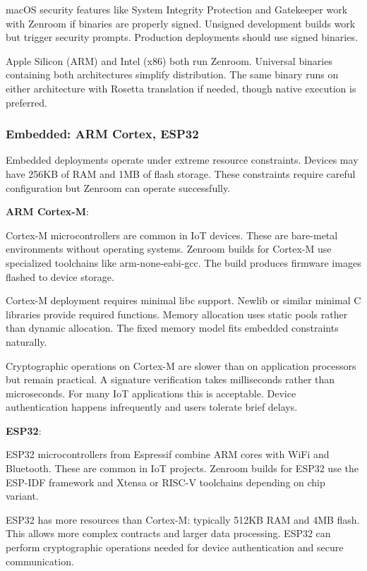macOS security features like System Integrity Protection and
Gatekeeper work with Zenroom if binaries are properly signed. Unsigned
development builds work but trigger security prompts. Production
deployments should use signed binaries.

Apple Silicon (ARM) and Intel (x86) both run Zenroom. Universal
binaries containing both architectures simplify distribution. The same
binary runs on either architecture with Rosetta translation if needed,
though native execution is preferred.

\subsubsection{Embedded: ARM Cortex, ESP32}

Embedded deployments operate under extreme resource
constraints. Devices may have 256KB of RAM and 1MB of flash
storage. These constraints require careful configuration but Zenroom
can operate successfully.

\textbf{ARM Cortex-M}:

Cortex-M microcontrollers are common in IoT devices. These are
bare-metal environments without operating systems. Zenroom builds for
Cortex-M use specialized toolchains like arm-none-eabi-gcc. The build
produces firmware images flashed to device storage.

Cortex-M deployment requires minimal libc support. Newlib or similar
minimal C libraries provide required functions. Memory allocation uses
static pools rather than dynamic allocation. The fixed memory model
fits embedded constraints naturally.

Cryptographic operations on Cortex-M are slower than on application
processors but remain practical. A signature verification takes
milliseconds rather than microseconds. For many IoT applications this
is acceptable. Device authentication happens infrequently and users
tolerate brief delays.

\textbf{ESP32}:

ESP32 microcontrollers from Espressif combine ARM cores with WiFi and
Bluetooth. These are common in IoT projects. Zenroom builds for ESP32
use the ESP-IDF framework and Xtensa or RISC-V toolchains depending on
chip variant.

ESP32 has more resources than Cortex-M: typically 512KB RAM and 4MB
flash. This allows more complex contracts and larger data
processing. ESP32 can perform cryptographic operations needed for
device authentication and secure communication.

